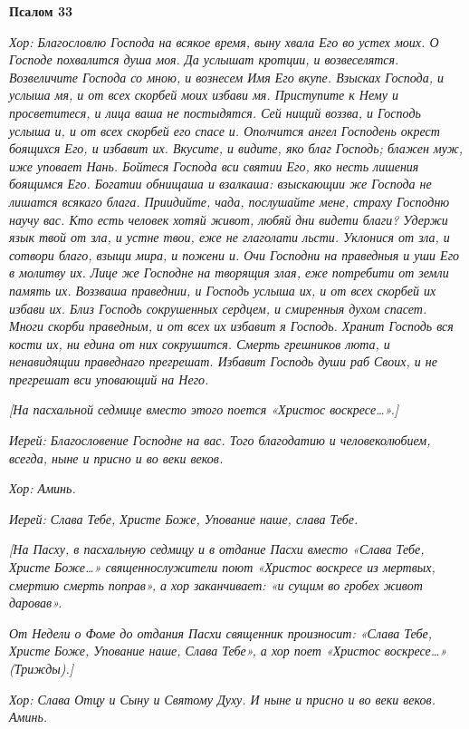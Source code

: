  

\bfseries  Псалом 33\normalfont{}


 \itshape Хор:\normalfont{} Благословлю Господа на всякое время, выну хвала Его во устех
моих. О Господе похвалится душа моя. Да услышат кротции, и возвеселятся.
Возвеличите Господа со мною, и вознесем Имя Его вкупе. Взысках Господа,
и услыша мя, и от всех скорбей моих избави мя. Приступите к Нему
и просветитеся, и лица ваша не постыдятся. Сей нищий воззва, и
Господь услыша и, и от всех скорбей его спасе и. Ополчится ангел
Господень окрест боящихся Его, и избавит их. Вкусите, и видите, яко
благ Господь; блажен муж, иже уповает Нань. Бойтеся Господа вси
святии Его, яко несть лишения боящимся Его. Богатии обнищаша и
взалкаша: взыскающии же Господа не лишатся всякаго блага. Приидийте,
чада, послушайте мене, страху Господню научу вас. Кто есть человек
хотяй живот, любяй дни видети благи? Удержи язык твой от зла, и
устне твои, еже не глаголати льсти. Уклонися от зла, и сотвори благо,
взыщи мира, и пожени и. Очи Господни на праведныя и уши Его в
молитву их. Лице же Господне на творящия злая, еже потребити
от земли память их. Воззваша праведнии, и Господь услыша их, и
от всех скорбей их избави их. Близ Господь сокрушенных сердцем,
и смиренныя духом спасет. Многи скорби праведным, и от всех их
избавит я Господь. Хранит Господь вся кости их, ни едина от них
сокрушится. Смерть грешников люта, и ненавидящии праведнаго прегрешат.
Избавит Господь души раб Своих, и не прегрешат вси уповающий на
Него.


 \itshape [На пасхальной седмице вместо этого поется «Христос воскресе…».]\normalfont{}


 \itshape Иерей:\normalfont{} Благословение Господне на вас. Того благодатию и человеколюбием,
всегда, ныне и присно и во веки веков.


 \itshape Хор:\normalfont{} Аминь.


 \itshape Иерей:\normalfont{} Слава Тебе, Христе Боже, Упование наше, слава Тебе.


 \itshape [На Пасху, в пасхальную седмицу и в отдание Пасхи вместо «Слава Тебе,
Христе Боже…» священнослужители поют «Христос воскресе из мертвых,
смертию смерть поправ», а хор заканчивает: «и сущим во гробех живот
даровав».\normalfont{}


 \itshape От Недели о Фоме до отдания Пасхи священник произносит: «Слава
Тебе, Христе Боже, Упование наше, Слава Тебе», а хор поет «Христос
воскресе…» (Трижды).]\normalfont{}


 \itshape Хор:\normalfont{} Слава Отцу и Сыну и Святому Духу. И ныне и присно и во веки
веков. Аминь.


